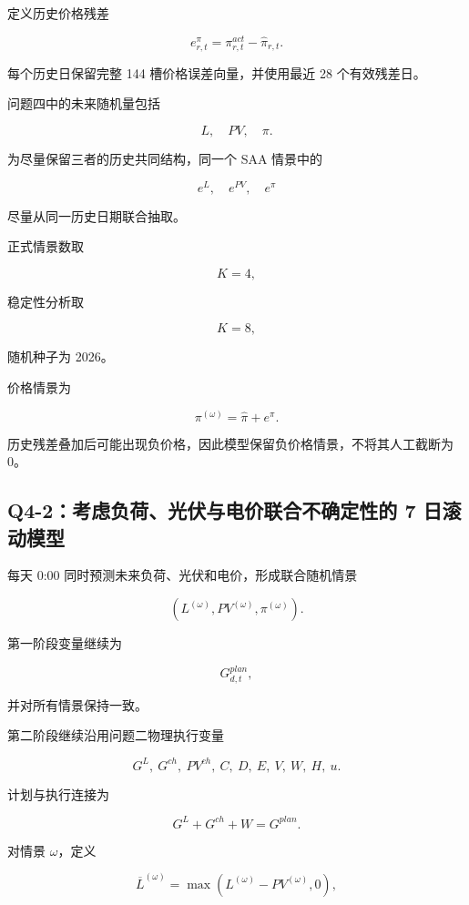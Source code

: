 定义历史价格残差

\begin{equation}
e^\pi_{r,t}
=
\pi^{act}_{r,t}
-
\hat\pi_{r,t}.
\end{equation}

每个历史日保留完整 144 槽价格误差向量，并使用最近 28 个有效残差日。

问题四中的未来随机量包括

\[
L,\quad PV,\quad \pi.
\]

为尽量保留三者的历史共同结构，同一个 SAA 情景中的

\[
e^L,\quad e^{PV},\quad e^\pi
\]

尽量从同一历史日期联合抽取。

正式情景数取

\[
K=4,
\]

稳定性分析取

\[
K=8,
\]

随机种子为 2026。

价格情景为

\begin{equation}
\pi^{(\omega)}
=
\hat\pi+e^\pi.
\end{equation}

历史残差叠加后可能出现负价格，因此模型保留负价格情景，不将其人工截断为 0。

\subsection{Q4-2：考虑负荷、光伏与电价联合不确定性的 7 日滚动模型}

每天 0:00 同时预测未来负荷、光伏和电价，形成联合随机情景

\[
\left(
L^{(\omega)},
PV^{(\omega)},
\pi^{(\omega)}
\right).
\]

第一阶段变量继续为

\[
G^{plan}_{d,t},
\]

并对所有情景保持一致。

第二阶段继续沿用问题二物理执行变量

\[
G^L,\ G^{ch},\ PV^{ch},\ C,\ D,\ E,\ V,\ W,\ H,\ u.
\]

计划与执行连接为

\begin{equation}
G^L+G^{ch}+W
=
G^{plan}.
\end{equation}

对情景 \(\omega\)，定义

\[
\overline L^{(\omega)}
=
\max(L^{(\omega)}-PV^{(\omega)},0),
\]

